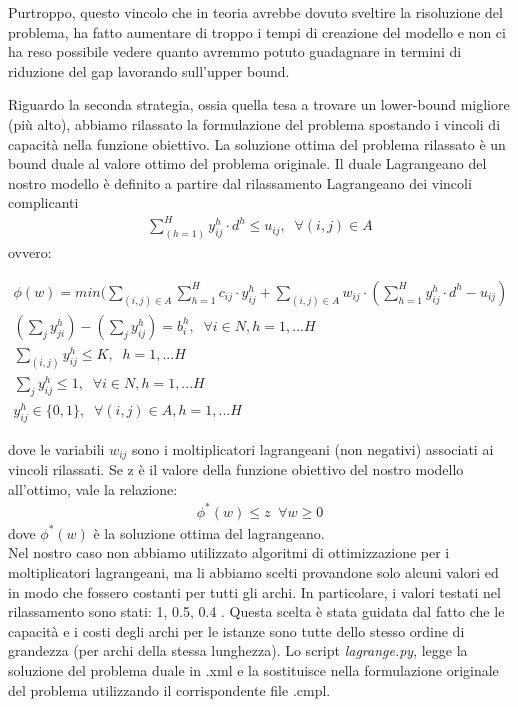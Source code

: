 \documentclass{article}
\begin{document}
Purtroppo, questo vincolo che in teoria avrebbe dovuto sveltire la risoluzione del problema, ha fatto aumentare di troppo i tempi di creazione del modello e non ci ha reso possibile vedere quanto avremmo potuto guadagnare in termini di riduzione del gap lavorando sull'upper bound.

Riguardo la seconda strategia, ossia quella tesa a trovare un lower-bound migliore (più alto), abbiamo rilassato la formulazione del problema spostando i vincoli di capacità nella funzione obiettivo. La soluzione ottima del problema rilassato è un bound duale al valore ottimo del problema originale.
Il duale Lagrangeano del nostro modello è definito a partire dal rilassamento Lagrangeano dei vincoli complicanti 
\begin{align}
    \sum_{(h=1)}^H y_{ij}^h \cdot d^h \leq u_{ij}, \; \; \forall (i,j) \in A
    \label{eq:vcap}
\end{align}
ovvero:

\begin{align}
    \phi(w) = min (\sum_{(i,j) \in A}\sum_{h=1}^H c_{ij} \cdot y_{ij}^h + \sum_{(i,j) \in A} w_{ij} \cdot(\sum_{h=1}^H y_{ij}^h \cdot d^h - u_{ij})
    \label{mod:lagobj}
    \\
    (\sum_{j}y_{ji}^h)- (\sum_{j}y_{ij}^h ) = b_i^h, \; \; \forall i \in N, h=1, ... H
    \label{mod:lagv2}
    \\
    \sum_{(i,j)} y_{ij}^h  \leq K, \; \; h=1, ... H
    \label{mod:lagv4}
    \\
    \sum_{j} y_{ij}^h \leq 1, \; \; \forall i \in \textit{N} , h=1, ... H
    \label{mod:lagv5}
    \\
     y_{ij}^h \in \{0,1\}, \; \; \forall (i,j) \in A, h=1, ... H
    \label{mod:lag}
\end{align}


dove le variabili $w_{ij}$ sono i moltiplicatori lagrangeani (non negativi) associati ai vincoli rilassati.
Se z è il valore della funzione obiettivo del nostro modello all'ottimo, vale la relazione:
\begin{align}
 \phi^*(w) \leq z \; \;     \forall w \geq 0
\end{align}
dove  $\phi^*(w)$ è la soluzione ottima del lagrangeano.
\\
Nel nostro caso non abbiamo utilizzato algoritmi di ottimizzazione per i moltiplicatori lagrangeani, ma li abbiamo scelti provandone solo alcuni valori ed in modo che fossero costanti per tutti gli archi. In particolare, i valori testati nel rilassamento sono stati: 1, 0.5, 0.4 .
Questa scelta è stata guidata dal fatto che le capacità e i costi degli archi per le istanze sono tutte dello stesso ordine di grandezza (per archi della stessa lunghezza). Lo script \emph{lagrange.py}, legge la soluzione del problema duale in .xml e la sostituisce nella formulazione originale del problema utilizzando il corrispondente file .cmpl.
\end{document}
